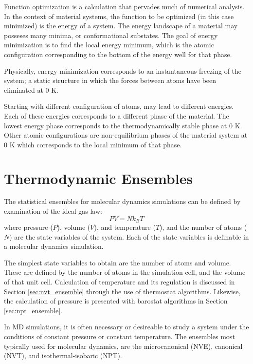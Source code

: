 Function optimization is a calculation that pervades much of numerical analysis.  In the context of material systems, the function to be optimized (in this case minimized) is the energy of a system.  The energy landscape of a material may posseses many minima, or conformational substates.  The goal of energy minimization is to find the local energy minimum, which is the atomic configuration corresponding to the bottom of the energy well for that phase.

Physically, energy minimization corresponds to an instantaneous freezing of the system; a static structure in which the forces between atoms have been eliminated at $0$ K.

Starting with different configuration of atoms, may lead to different energies.  Each of these energies corresponds to a different phase of the material.  The lowest energy phase corresponds to the thermodynamically stable phase at $0$ K.  Other atomic configurations are non-equilibrium phases of the material system at $0$ K which corresponds to the local minimum of that phase.

\section{Thermodynamic Ensembles}
  The statistical ensembles for molecular dynamics simulations can be defined by examination of the ideal gas law:
  \begin{equation}
  \label{eq:ideal_gas_law}
    PV = N k_B T
  \end{equation}
  where pressure ($P$), volume ($V$), and temperature ($T$), and the number of atoms ($N$) are the state variables of the system.  Each of the state variables is definable in a molecular dynamics simulation.

  The simplest state variables to obtain are the number of atoms and volume.  These are defined by the number of atoms in the simulation cell, and the volume of that unit cell.  Calculation of temperature and its regulation is discussed in Section \ref{sec:nvt_ensemble} through the use of thermostat algorithms.  Likewise, the calculation of pressure is presented with barostat algorithms in Section \ref{sec:npt_ensemble}.

  In MD simulations, it is often necessary or desireable to study a system under the conditions of constant pressure or constant temperature.  The ensembles most typically used for molecular dynamics, are the microcanonical (NVE), canonical (NVT), and isothermal-isobaric (NPT).

